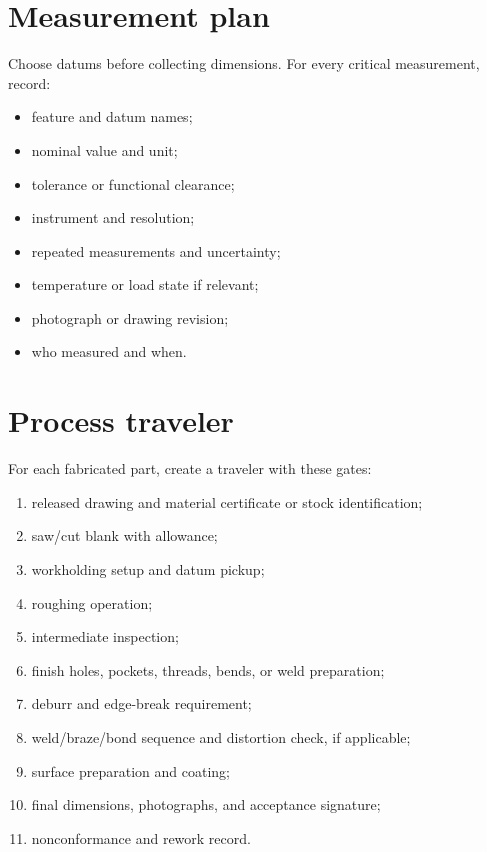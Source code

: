 \documentclass[10pt,openany]{book}
\begin{document}
\section{Measurement plan}

Choose datums before collecting dimensions. For every critical measurement, record:

\begin{itemize}
  \item feature and datum names;
  \item nominal value and unit;
  \item tolerance or functional clearance;
  \item instrument and resolution;
  \item repeated measurements and uncertainty;
  \item temperature or load state if relevant;
  \item photograph or drawing revision;
  \item who measured and when.
\end{itemize}


\section{Process traveler}

For each fabricated part, create a traveler with these gates:

\begin{enumerate}
  \item released drawing and material certificate or stock identification;
  \item saw/cut blank with allowance;
  \item workholding setup and datum pickup;
  \item roughing operation;
  \item intermediate inspection;
  \item finish holes, pockets, threads, bends, or weld preparation;
  \item deburr and edge-break requirement;
  \item weld/braze/bond sequence and distortion check, if applicable;
  \item surface preparation and coating;
  \item final dimensions, photographs, and acceptance signature;
  \item nonconformance and rework record.
\end{enumerate}
\end{document}
